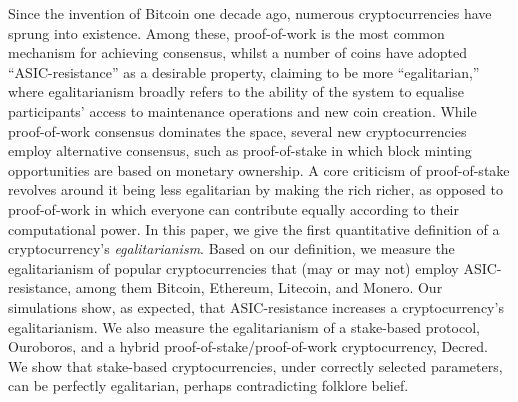 Since the invention of Bitcoin one decade ago, numerous cryptocurrencies have
sprung into existence. Among these, proof-of-work is the most common mechanism
for achieving consensus, whilst a number of coins have adopted
``ASIC-resistance'' as a desirable property, claiming to be more
``egalitarian,'' where egalitarianism broadly refers to the ability of the
system to equalise participants' access to maintenance operations and new coin
creation.  While proof-of-work consensus dominates the space, several new
cryptocurrencies employ alternative consensus, such as proof-of-stake in which
block minting opportunities are based on monetary ownership.  A core criticism
of proof-of-stake revolves around it being less egalitarian by making the rich
richer, as opposed to proof-of-work in which everyone can contribute equally
according to their computational power. In this paper, we give the first
quantitative definition of a cryptocurrency's \emph{egalitarianism}.  Based on
our definition, we measure the egalitarianism of popular cryptocurrencies that
(may or may not) employ ASIC-resistance, among them Bitcoin, Ethereum,
Litecoin, and Monero. Our simulations show, as expected, that ASIC-resistance
increases a cryptocurrency's egalitarianism.  We also measure the
egalitarianism of a stake-based protocol, Ouroboros, and a hybrid
proof-of-stake/proof-of-work cryptocurrency, Decred.  We show that stake-based
cryptocurrencies, under correctly selected parameters, can be perfectly
egalitarian, perhaps contradicting folklore belief.

